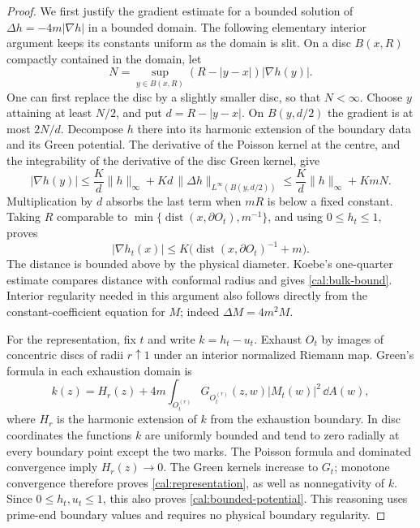 \begin{proof}
We first justify the gradient estimate for a bounded solution of
$\Delta h=-4m|\nabla h|$ in a bounded domain.  The following elementary
interior argument keeps its constants uniform as the domain is slit.
On a disc $B(x,R)$ compactly contained in the domain, let
\[
 N=\sup_{y\in B(x,R)}(R-|y-x|)|\nabla h(y)|.
\]
One can first replace the disc by a slightly smaller disc, so that
$N<\infty$.  Choose $y$ attaining at least $N/2$, and put
$d=R-|y-x|$.  On $B(y,d/2)$ the gradient is at most $2N/d$.
Decompose $h$ there into its harmonic extension of the boundary data
and its Green potential.  The derivative of the Poisson kernel at the
centre, and the integrability of the derivative of the disc Green
kernel, give
\[
 |\nabla h(y)|\leq \frac{K}{d}\|h\|_\infty+
       Kd\,\|\Delta h\|_{L^\infty(B(y,d/2))}
 \leq \frac{K}{d}\|h\|_\infty+KmN.
\]
Multiplication by $d$ absorbs the last term when $mR$ is below a fixed
constant.  Taking
$R$ comparable to $\min\{\operatorname{dist}(x,\partial O_t),m^{-1}\}$,
and using $0\leq h_t\leq1$, proves
\[
 |\nabla h_t(x)|\leq
 K\bigl(\operatorname{dist}(x,\partial O_t)^{-1}+m\bigr).
\]
The distance is bounded above by the physical diameter.  Koebe's
one-quarter estimate compares distance with conformal radius and gives
\eqref{cal:bulk-bound}.  Interior regularity needed in this argument
also follows directly from the constant-coefficient equation for $M$;
indeed $\Delta M=4m^2M$.

For the representation, fix $t$ and write $k=h_t-u_t$.  Exhaust $O_t$
by images of concentric discs of radii $r\uparrow1$ under an interior
normalized Riemann map.  Green's formula in each exhaustion domain is
\[
 k(z)=H_r(z)+4m\int_{O_t^{(r)}}
                   G_{O_t^{(r)}}(z,w)|M_t(w)|^2\,\dd A(w),
\]
where $H_r$ is the harmonic extension of $k$ from the exhaustion
boundary.  In disc coordinates the functions $k$ are uniformly bounded
and tend to zero radially at every boundary point except the two
marks.  The Poisson formula and dominated convergence imply
$H_r(z)\to0$.  The Green kernels increase to $G_t$; monotone convergence
therefore proves \eqref{cal:representation}, as well as nonnegativity
of $k$.  Since $0\leq h_t,u_t\leq1$, this also proves
\eqref{cal:bounded-potential}.  This reasoning uses prime-end boundary
values and requires no physical boundary regularity.
\end{proof}

